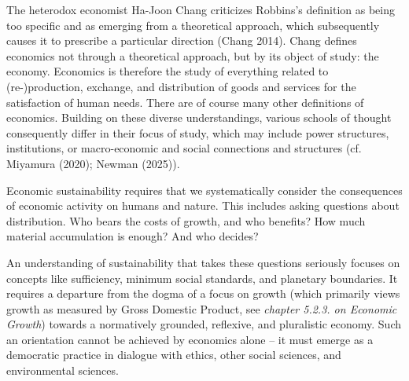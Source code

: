 \documentclass[
  a4paper,
  openany]{book}
\begin{document}
The heterodox economist Ha-Joon Chang criticizes Robbins's definition as
being too specific and as emerging from a theoretical approach, which
subsequently causes it to prescribe a particular direction (Chang 2014).
Chang defines economics not through a theoretical approach, but by its
object of study: the economy. Economics is therefore the study of
everything related to (re-)production, exchange, and distribution of
goods and services for the satisfaction of human needs. There are of
course many other definitions of economics. Building on these diverse
understandings, various schools of thought consequently differ in their
focus of study, which may include power structures, institutions, or
macro-economic and social connections and structures (cf. Miyamura
(2020); Newman (2025)).

Economic sustainability requires that we systematically consider the
consequences of economic activity on humans and nature. This includes
asking questions about distribution. Who bears the costs of growth, and
who benefits? How much material accumulation is enough? And who decides?

An understanding of sustainability that takes these questions seriously
focuses on concepts like sufficiency, minimum social standards, and
planetary boundaries. It requires a departure from the dogma of a focus
on growth (which primarily views growth as measured by Gross Domestic
Product, see \emph{chapter 5.2.3. on Economic Growth}) towards a
normatively grounded, reflexive, and pluralistic economy. Such an
orientation cannot be achieved by economics alone -- it must emerge as a
democratic practice in dialogue with ethics, other social sciences, and
environmental sciences.
\end{document}
